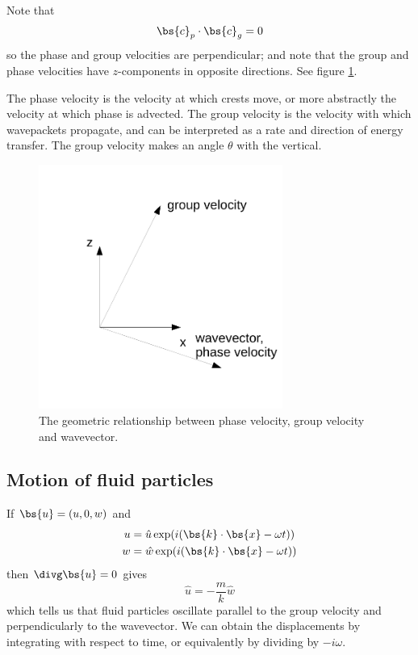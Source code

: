 Note that 
\begin{equation}
	\bs{c}_p\cdot\bs{c}_g = 0
\end{equation}
so the phase and group velocities are perpendicular; and note that the group and phase velocities have $z$-components in opposite directions. See figure \ref{fig:igw-wave-vels}.

The phase velocity is the velocity at which crests move, or more abstractly the velocity at which phase is advected. The group velocity is the velocity with which wavepackets propagate, and can be interpreted as a rate and direction of energy transfer. The group velocity makes an angle $\theta$ with the vertical. 

\begin{figure}
\begin{center}
	\includegraphics[width=8cm]{igw-wave-vels.pdf}
	\caption{The geometric relationship between phase velocity, group velocity and wavevector.}
	\label{fig:igw-wave-vels}
\end{center}
\end{figure}

\subsection{Motion of fluid particles}

If $\bs{u} = (u,0,w)$ and 
\begin{align}
	u&=\hat{u} \exp(i(\bs{k}\cdot\bs{x} - \omega t)) \\
	w&=\hat{w} \exp(i(\bs{k}\cdot\bs{x} - \omega t)) \\
\end{align}
then $\divg\bs{u}=0$ gives
\begin{equation}
	\hat{u} = -\frac{m}{k}\hat{w}
\end{equation}
which tells us that fluid particles oscillate parallel to the group velocity and perpendicularly to the wavevector. We can obtain the displacements by integrating with respect to time, or equivalently by dividing by $-i\omega$. 

